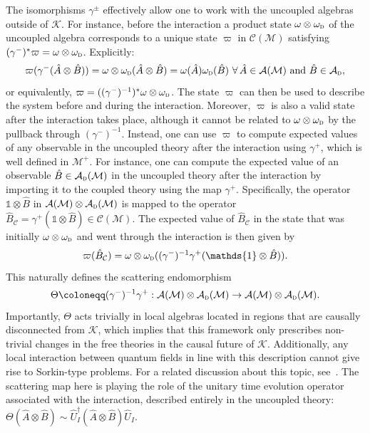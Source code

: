 \documentclass[letterpaper,12pt,titlepage,oneside,final]{book}
\newcommand{\openone}{\mathds{1}}
\newcommand{\M}{\mathcal{M}}
\newcommand{\tc}[1]{\textsc{#1}}
\begin{document}
The isomorphisms $\gamma^\pm$ effectively allow one to work with the uncoupled algebras outside of $\mathcal{K}$. For instance, before the interaction a product state $\omega\otimes\omega_\tc{d}$ of the uncoupled algebra corresponds to a unique state $\varpi$ in $\mathcal{C}(\M)$ satisfying $(\gamma^-)^*\varpi = \omega\otimes \omega_\tc{d}$. Explicitly:
\begin{equation}
    \varpi(\gamma^-(\hat{A}\otimes\hat{B})) = \omega\otimes\omega_\tc{d}(\hat{A}\otimes\hat{B}) = \omega(\hat{A}) \omega_\tc{d}(\hat{B}) \,\,\forall\,\hat{A}\in \mathcal{A}(\M)\text{ and } \hat{B}\in\mathcal{A}_\tc{d},
\end{equation}
or equivalently, $\varpi = ((\gamma^-)^{-1})^*\omega\otimes \omega_\tc{d}$. The state $\varpi$ can then be used to describe the system before and during the interaction. Moreover, $\varpi$ is also a valid state after the interaction takes place, although it cannot be related to $\omega\otimes\omega_\tc{d}$ by the pullback through $(\gamma^-)^{-1}$. Instead, one can use $\varpi$ to compute expected values of any observable in the uncoupled theory after the interaction using $\gamma^+$, which is well defined in $\mathcal{M}^+$. For instance, one can compute the expected value of an observable $\hat{B}\in\mathcal{A}_\tc{d}(\M)$ in the uncoupled theory after the interaction by importing it to the coupled theory using the map $\gamma^+$. Specifically, the operator $\openone\otimes \hat{B}$ in $\mathcal{A}(\M)\otimes \mathcal{A}_\tc{d}(\M)$ is mapped to the operator $\hat{B}_\mathcal{C} = \gamma^+(\openone\otimes \hat{B})\in\mathcal{C}(\M)$. The expected value of $\hat{B}_\mathcal{C}$ in the state that was initially $\omega\otimes\omega_\tc{d}$ and went through the interaction is then given by
\begin{equation}
    \varpi(\hat{B}_\mathcal{C}) = \omega\otimes\omega_\tc{d}((\gamma^-)^{-1}\gamma^+(\openone \otimes \hat{B})).
\end{equation}
This naturally defines the scattering endomorphism
\begin{equation}
    \Theta \coloneqq (\gamma^-)^{-1}\gamma^+:\mathcal{A}(\M)\otimes\mathcal{A}_\tc{d}(\M)\rightarrow\mathcal{A}(\M)\otimes\mathcal{A}_\tc{d}(\M).
\end{equation}
Importantly, $\Theta$ acts trivially in local algebras located in regions that are causally disconnected from $\mathcal{K}$, which implies that this framework only prescribes non-trivial changes in the free theories in the causal future of $\mathcal{K}$. Additionally, any local interaction between quantum fields in line with this description cannot give rise to Sorkin-type problems. For a related discussion about this topic, see~\cite{impossibleImpossible}. The scattering map here is playing the role of the unitary time evolution operator associated with the interaction, described entirely in the uncoupled theory: $\Theta(\hat{A}\otimes\hat{B}) \sim \hat{U}_I^\dagger (\hat{A}\otimes\hat{B})\hat{U}_I$.
\end{document}
